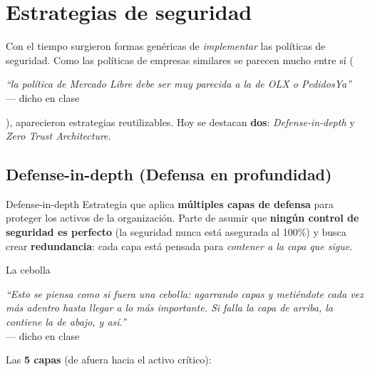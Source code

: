 \documentclass[11pt,a4paper]{article}
\newcommand{\prof}[1]{\par\medskip\noindent\textit{``#1''}\\[-2pt]\hspace*{1em}%
  {\footnotesize\textcolor{black!60}{--- dicho en clase}}\par\medskip\noindent}
\begin{document}
\section{Estrategias de seguridad}

Con el tiempo surgieron formas genéricas de \emph{implementar} las políticas de seguridad. Como
las políticas de empresas similares se parecen mucho entre sí (\prof{la política de Mercado
Libre debe ser muy parecida a la de OLX o PedidosYa}), aparecieron estrategias reutilizables.
Hoy se destacan \textbf{dos}: \emph{Defense-in-depth} y \emph{Zero Trust Architecture}.

\subsection{Defense-in-depth (Defensa en profundidad)}

\begin{defbox}{Defense-in-depth}
Estrategia que aplica \textbf{múltiples capas de defensa} para proteger los activos de la
organización. Parte de asumir que \textbf{ningún control de seguridad es perfecto} (la seguridad
nunca está asegurada al 100\%) y busca crear \textbf{redundancia}: cada capa está pensada para
\emph{contener a la capa que sigue}.
\end{defbox}

\begin{anecbox}{La cebolla}
\prof{Esto se piensa como si fuera una cebolla: agarrando capas y metiéndote cada vez más
adentro hasta llegar a lo más importante. Si falla la capa de arriba, la contiene la de abajo,
y así.}
\end{anecbox}

Las \textbf{5 capas} (de afuera hacia el activo crítico):

\begin{center}
\end{center}
\end{document}
